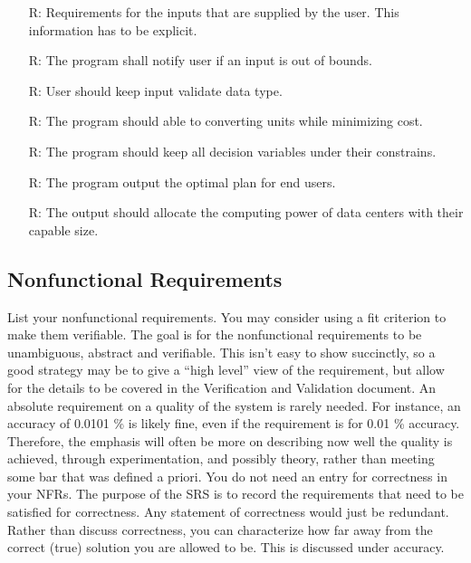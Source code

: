\documentclass[12pt]{article}
\newcounter{reqnum} %
\begin{document}
\noindent \begin{itemize}

\item[R\refstepcounter{reqnum}\thereqnum \label{R_Inputs}:] {Requirements for the inputs that are supplied by the user.  This information has to be explicit.}

\item[R\refstepcounter{reqnum}\thereqnum \label{R_OutputInputs}:] {The program shall notify user if an input is out of bounds.}

\item[R\refstepcounter{reqnum}\thereqnum \label{R_Calculate}:] {User should keep input validate data type.}

\item[R\refstepcounter{reqnum}\thereqnum \label{R_VerifyOutput}:]
  {The program should able to converting units while minimizing cost.}

\item[R\refstepcounter{reqnum}\thereqnum \label{R_Output}:] {The program should keep all decision variables under their constrains.}
\item[R\refstepcounter{reqnum}\thereqnum \label{R_VerifyOutput}:]
  {The program output the optimal plan for end users.}
  \item[R\refstepcounter{reqnum}\thereqnum \label{R_VerifyOutput}:]
  {The output should allocate the computing power of data centers with their capable size.}
\end{itemize}


\subsection{Nonfunctional Requirements}

{List your nonfunctional requirements.  You may consider using a fit
  criterion to make them verifiable.}
{The goal is for the nonfunctional requirements to be unambiguous, abstract
  and verifiable.  This isn't easy to show succinctly, so a good strategy may be
to give a ``high level'' view of the requirement, but allow for the details to
be covered in the Verification and Validation document.}
{An absolute requirement on a quality of the system is rarely needed.  For
  instance, an accuracy of 0.0101 \% is likely fine, even if the requirement is
  for 0.01 \% accuracy.  Therefore, the emphasis will often be more on
  describing now well the quality is achieved, through experimentation, and
  possibly theory, rather than meeting some bar that was defined a priori.}
{You do not need an entry for correctness in your NFRs.  The purpose of the
  SRS is to record the requirements that need to be satisfied for correctness.
  Any statement of correctness would just be redundant. Rather than discuss
  correctness, you can characterize how far away from the correct (true)
  solution you are allowed to be.  This is discussed under accuracy.}
\end{document}
